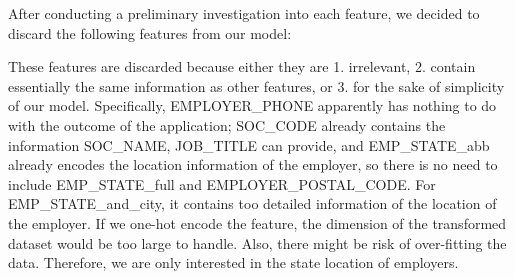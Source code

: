 \documentclass{article}
\begin{document}
After conducting a preliminary investigation into each feature, we decided to discard the following features from our model:

\begin{table}[H]
\centering
{}
\end{table}

These features are discarded because either they are 1. irrelevant, 2. contain essentially the same information as other features, or 3. for the sake of simplicity of our model. Specifically, EMPLOYER\_PHONE apparently has nothing to do with the outcome of the application; SOC\_CODE already contains the information SOC\_NAME, JOB\_TITLE can provide, and EMP\_STATE\_abb already encodes the location information of the employer, so there is no need to include EMP\_STATE\_full and EMPLOYER\_POSTAL\_CODE. For EMP\_STATE\_and\_city, it contains too detailed information of the location of the employer. If we one-hot encode the feature, the dimension of the transformed dataset would be too large to handle. Also, there might be risk of over-fitting the data. Therefore, we are only interested in the state location of employers.
\end{document}
